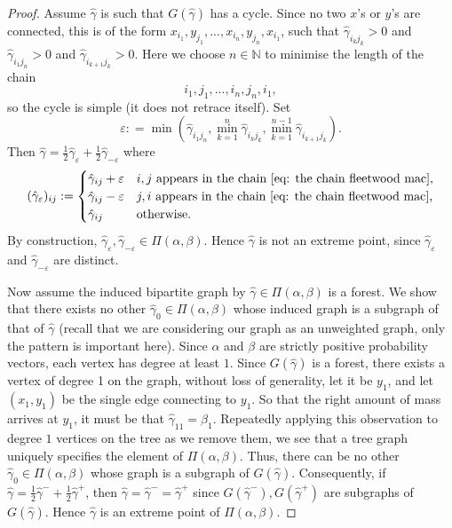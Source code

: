 \documentclass[11pt, oneside, titlepage]{book}
\theoremstyle{plain}
\theoremstyle{definition}
\newcommand{\N}{\mathbb{N}}
\begin{document}
\begin{proof}
    Assume $\hat\gamma$ is such that $G(\hat\gamma)$ has a cycle. Since no two $x$'s or $y$'s are connected, this is of the form $x_{i_1}, y_{j_1},..., x_{i_n}, y_{j_n}, x_{i_1}$, such that $\hat\gamma_{i_k j_k} >0$ and $\hat\gamma_{i_1 j_n} >0$ and $\hat\gamma_{i_{k+1} j_k} >0$. Here we choose $n \in \N$ to minimise the length of the chain
    \begin{equation}
    \label{eq: the chain fleetwood mac}
        i_1, j_1, ..., i_n, j_n, i_1,
    \end{equation}
    so the cycle is simple (it does not retrace itself). Set
    \begin{equation*}
        \varepsilon : = \min\left(\hat\gamma_{i_1 j_n}, \min_{k=1}^n \hat\gamma_{i_k j_k}, \min_{k=1}^{n-1} \hat\gamma_{i_{k+1} j_k}\right).
    \end{equation*}
    Then $\hat\gamma = \frac{1}{2}\hat\gamma_\varepsilon + \frac{1}{2} \hat\gamma_{-\varepsilon}$ where
    \begin{equation*}
        (\hat\gamma_{\varepsilon})_{ij} := \begin{cases}
            \hat\gamma_{ij} + \varepsilon & i,j \text{ appears in the chain \eqref{eq: the chain fleetwood mac},}\\
            \hat\gamma_{ij} - \varepsilon & j,i \text{ appears in the chain \eqref{eq: the chain fleetwood mac},} \\
            \hat\gamma_{ij} & \text{otherwise}.
        \end{cases}
    \end{equation*}
    By construction, $\hat\gamma_\varepsilon, \hat\gamma_{-\varepsilon} \in \Pi(\alpha, \beta)$. Hence $\hat\gamma$ is not an extreme point, since $\hat\gamma_{\varepsilon}$ and $\hat\gamma_{-\varepsilon}$ are distinct.

    Now assume the induced bipartite graph by $\hat\gamma \in \Pi(\alpha, \beta)$ is a forest. We show that there exists no other $\hat\gamma_0 \in \Pi(\alpha, \beta)$ whose induced graph is a subgraph of that of $\hat\gamma$ (recall that we are considering our graph as an unweighted graph, only the pattern is important here). Since $\alpha$ and $\beta$ are strictly positive probability vectors, each vertex has degree at least $1$. Since $G(\hat\gamma)$ is a forest, there exists a vertex of degree 1 on the graph, without loss of generality, let it be $y_1$, and let $(x_1, y_1)$ be the single edge connecting to $y_1$. So that the right amount of mass arrives at $y_1$, it must be that $\hat\gamma_{11} = \beta_1$. Repeatedly applying this observation to degree $1$ vertices on the tree as we remove them, we see that a tree graph uniquely specifies the element of $\Pi(\alpha, \beta)$. Thus, there can be no other $\hat\gamma_0 \in \Pi(\alpha, \beta)$ whose graph is a subgraph of $G(\hat\gamma)$. Consequently, if $\hat\gamma = \frac{1}{2}\hat\gamma^{-} + \frac{1}{2} \hat\gamma^{+}$, then $\hat \gamma = \hat\gamma^- = \hat\gamma^+$ since $G(\hat\gamma^-), G(\hat\gamma^+)$ are subgraphs of $G(\hat\gamma)$. Hence $\hat\gamma$ is an extreme point of $\Pi(\alpha, \beta)$.
\end{proof}
\end{document}
